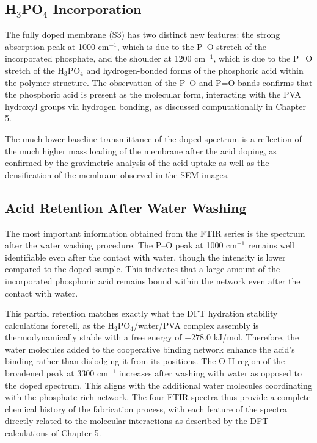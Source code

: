 \documentclass[12pt,a4paper]{report}
\begin{document}
\subsection{H\(_3\)PO\(_4\) Incorporation}
The fully doped membrane (S3) has two distinct new features: the strong absorption peak at 1000 cm\(^{-1}\), which is due to the P–O stretch of the incorporated phosphate, and the shoulder at 1200 cm\(^{-1}\), which is due to the P=O stretch of the H\(_3\)PO\(_4\) and hydrogen-bonded forms of the phosphoric acid within the polymer structure. The observation of the P–O and P=O bands confirms that the phosphoric acid is present as the molecular form, interacting with the PVA hydroxyl groups via hydrogen bonding, as discussed computationally in Chapter 5.

The much lower baseline transmittance of the doped spectrum is a reflection of the much higher mass loading of the membrane after the acid doping, as confirmed by the gravimetric analysis of the acid uptake as well as the densification of the membrane observed in the SEM images.\cite{52,58}

\subsection{Acid Retention After Water Washing}
The most important information obtained from the FTIR series is the spectrum after the water washing procedure. The P–O peak at 1000 cm\(^{-1}\) remains well identifiable even after the contact with water, though the intensity is lower compared to the doped sample. This indicates that a large amount of the incorporated phosphoric acid remains bound within the network even after the contact with water.\cite{52,55}

This partial retention matches exactly what the DFT hydration stability calculations foretell, as the H\(_3\)PO\(_4\)/water/PVA complex assembly is thermodynamically stable with a free energy of \(-278.0\) kJ/mol. Therefore, the water molecules added to the cooperative binding network enhance the acid’s binding rather than dislodging it from its positions. The O-H region of the broadened peak at 3300 cm\(^{-1}\) increases after washing with water as opposed to the doped spectrum. This aligns with the additional water molecules coordinating with the phosphate-rich network. The four FTIR spectra thus provide a complete chemical history of the fabrication process, with each feature of the spectra directly related to the molecular interactions as described by the DFT calculations of Chapter 5.\cite{21, 55, 94}
\end{document}
